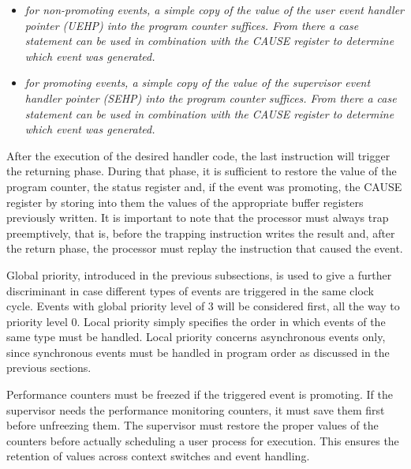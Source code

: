 \documentclass{article}
\begin{document}
\begin{enumerate}
                    \begin{itemize}

                        \item \textit{for non-promoting events, a simple copy of the value of the user event handler pointer (UEHP) into the program counter suffices. From there a case statement can be used in combination with the CAUSE register to determine which event was generated.}

                        \item \textit{for promoting events, a simple copy of the value of the supervisor event handler pointer (SEHP) into the program counter suffices. From there a case statement can be used in combination with the CAUSE register to determine which event was generated.}

                    \end{itemize}

            \end{enumerate}

            After the execution of the desired handler code, the last instruction will trigger the returning phase. During that phase, it is sufficient to restore the value of the program counter, the status register and, if the event was promoting, the CAUSE register by storing into them the values of the appropriate buffer registers previously written. It is important to note that the processor must always trap preemptively, that is, before the trapping instruction writes the result and, after the return phase, the processor must replay the instruction that caused the event.

            \vspace{10pt} 

            Global priority, introduced in the previous subsections, is used to give a further discriminant in case different types of events are triggered in the same clock cycle. Events with global priority level of 3 will be considered first, all the way to priority level 0. Local priority simply specifies the order in which events of the same type must be handled. Local priority concerns asynchronous events only, since synchronous events must be handled in program order as discussed in the previous sections.

            \vspace{10pt}

            Performance counters must be freezed if the triggered event is promoting. If the supervisor needs the performance monitoring counters, it must save them first before unfreezing them. The supervisor must restore the proper values of the counters before actually scheduling a user process for execution. This ensures the retention of values across context switches and event handling.
\end{document}
